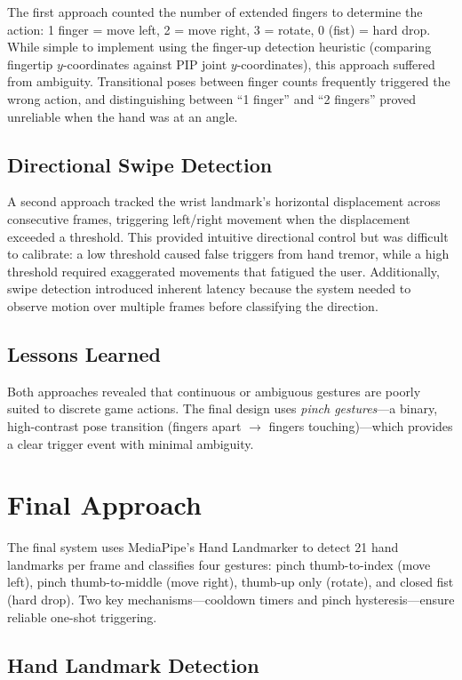 \documentclass[conference]{IEEEtran}
\begin{document}
The first approach counted the number of extended fingers to determine the action: 1 finger = move left, 2 = move right, 3 = rotate, 0 (fist) = hard drop. While simple to implement using the finger-up detection heuristic (comparing fingertip $y$-coordinates against PIP joint $y$-coordinates), this approach suffered from ambiguity. Transitional poses between finger counts frequently triggered the wrong action, and distinguishing between ``1 finger'' and ``2 fingers'' proved unreliable when the hand was at an angle.

\subsection{Directional Swipe Detection}

A second approach tracked the wrist landmark's horizontal displacement across consecutive frames, triggering left/right movement when the displacement exceeded a threshold. This provided intuitive directional control but was difficult to calibrate: a low threshold caused false triggers from hand tremor, while a high threshold required exaggerated movements that fatigued the user. Additionally, swipe detection introduced inherent latency because the system needed to observe motion over multiple frames before classifying the direction.

\subsection{Lessons Learned}

Both approaches revealed that continuous or ambiguous gestures are poorly suited to discrete game actions. The final design uses \emph{pinch gestures}---a binary, high-contrast pose transition (fingers apart $\rightarrow$ fingers touching)---which provides a clear trigger event with minimal ambiguity.

\section{Final Approach}

The final system uses MediaPipe's Hand Landmarker to detect 21 hand landmarks per frame and classifies four gestures: pinch thumb-to-index (move left), pinch thumb-to-middle (move right), thumb-up only (rotate), and closed fist (hard drop). Two key mechanisms---cooldown timers and pinch hysteresis---ensure reliable one-shot triggering.

\subsection{Hand Landmark Detection}
\end{document}

